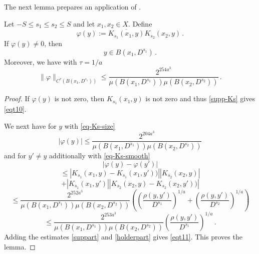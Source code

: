 The next lemma prepares an application of
.
\begin{lemma}\label{correlation-kernel-bound}
\leanok
{}
Let $-S\le s_1\le s_2\le S$ and let $x_1,x_2\in X$.
Define \begin{equation}
 \varphi(y) := \overline{K_{s_1}(x_1, y)}
 K_{s_2}(x_2, y) \, .
\end{equation}
If $\varphi(y)\neq 0$, then
\begin{equation}\label{eqt10}
    y\in B(x_1, D^{s_1})\, .
\end{equation}
Moreover, we have with $\tau = 1/a$
\begin{equation}\label{eqt11}
  \|\varphi\|_{C^\tau(B(x_1, D^{s_1}))}\le
\frac{2^{254 a^3}}{\mu(B(x_1, D^{s_1}))\mu(B(x_2, D^{s_2}))}
      \, .
\end{equation}

\end{lemma}
\begin{proof}

If $\varphi(y)$ is not zero, then $K_{s_1}(x_1, y)$ is not zero and thus
\eqref{supp-Ks} gives \eqref{eqt10}.

We next have for $y$ with \eqref{eq-Ks-size}
\begin{equation}\label{suppart}
    |\varphi(y)|\le
    \frac{2^{204 a^3}}{\mu(B(x_1, D^{s_1}))\mu(B(x_2, D^{s_2}))}
\end{equation}
and for $y'\neq y$ additionally with \eqref{eq-Ks-smooth}
\begin{equation}
    |\varphi(y)-\varphi(y')|
 \end{equation}
 \begin{equation}
 \le
 |K_{s_1}(x_1,y)-K_{s_1}(x_1,y'))||
 K_{s_2}(x_2, y)|
\end{equation}
 \begin{equation}+|K_{s_1}(x_1, y')|
 |K_{s_2}(x_2, y) - K_{s_2}(x_2, y'))|
\end{equation}
\begin{equation}
      \le \frac{2^{252 a^3}}{\mu(B(x_1, D^{s_1}))\mu(B(x_2, D^{s_2}))}
       \left(\left(\frac{ \rho(y,y')}{D^{s_1}}\right)^{1/a}+
       \left(\frac{ \rho(y,y')}{D^{s_2}}\right)^{1/a}\right)
\end{equation}
\begin{equation}\label{holderpart}
      \le \frac{2^{253 a^3}}{\mu(B(x_1, D^{s_1}))\mu(B(x_2, D^{s_2}))}
       \left(\frac{ \rho(y,y')}{D^{s_1}}\right)^{1/a}\,.
\end{equation}
Adding the estimates \eqref{suppart} and \eqref{holderpart} gives \eqref{eqt11}.
This proves the lemma.
\end{proof}

